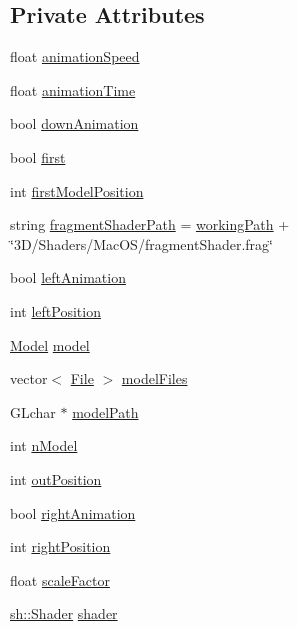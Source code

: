 \subsection*{Private Attributes}
\begin{DoxyCompactItemize}
\item 
float \hyperlink{classThreeD_a163b3d056baf55e06ac10cf06afd8a19}{animation\+Speed}
\item 
float \hyperlink{classThreeD_a22ff8a649bc0c6bfeb901bf4e5ad58f0}{animation\+Time}
\item 
bool \hyperlink{classThreeD_ad0852e7fce074e4bd6fbe6ea59d1fdd0}{down\+Animation}
\item 
bool \hyperlink{classThreeD_a0c77a57282a44dda09d831baa75d8d2f}{first}
\item 
int \hyperlink{classThreeD_a430fa8b4d8d04de359a6422d7bb533c1}{first\+Model\+Position}
\item 
string \hyperlink{classThreeD_a53baa9e879782cda613dfc831ee48281}{fragment\+Shader\+Path} = \hyperlink{Global_8h_a28e2efd443bc60075ab13410d1702148}{working\+Path} + \char`\"{}3\+D/\+Shaders/\+Mac\+O\+S/fragment\+Shader.\+frag\char`\"{}
\item 
bool \hyperlink{classThreeD_a93f3dd02240c35bd5f55fc3660ceb53b}{left\+Animation}
\item 
int \hyperlink{classThreeD_a0926126096803cba6bac20ef37e05c88}{left\+Position}
\item 
\hyperlink{classModel}{Model} \hyperlink{classThreeD_a037d4aa7448d209ecce1782c83175d67}{model}
\item 
vector$<$ \hyperlink{classFile}{File} $>$ \hyperlink{classThreeD_ae5c9c865a765d578eb69a6505197aa9e}{model\+Files}
\item 
G\+Lchar $\ast$ \hyperlink{classThreeD_a13ca3a88683c98b655e033062eadb159}{model\+Path}
\item 
int \hyperlink{classThreeD_a39dd42df2f25fa5b03d32407569ac800}{n\+Model}
\item 
int \hyperlink{classThreeD_a1fed81253f5a23655c93a6774f246b48}{out\+Position}
\item 
bool \hyperlink{classThreeD_a9fd46e1b3cd60888cfe0506f937ef55b}{right\+Animation}
\item 
int \hyperlink{classThreeD_ab805f9f7e12a4f2fefa4a702627db957}{right\+Position}
\item 
float \hyperlink{classThreeD_a32999a5a3b2863ec63f835955ac3f826}{scale\+Factor}
\item 
\hyperlink{classsh_1_1Shader}{sh\+::\+Shader} \hyperlink{classThreeD_ad62aea7e5f504913746c5eecf1071ae2}{shader}

\end{DoxyCompactItemize}
